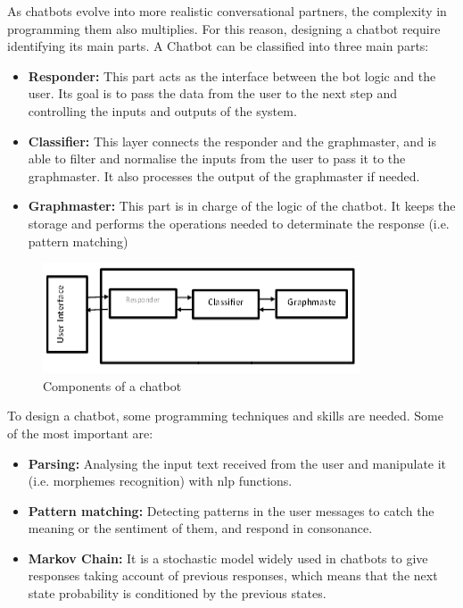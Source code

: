 As chatbots evolve into more realistic conversational partners, the complexity in programming them also multiplies. For this reason, designing a chatbot require identifying its main parts. A Chatbot can be classified into three main parts\cite{design_techniques}:
\begin{itemize}
    \item \textbf{Responder:} This part acts as the interface between the bot logic and the user. Its goal is to pass the data from the user to the next step and controlling the inputs and outputs of the system.
    \item \textbf{Classifier:} This layer connects the responder and the graphmaster, and is able to filter and normalise the inputs from the user to pass it to the graphmaster. It also processes the output of the graphmaster if needed.
    \item \textbf{Graphmaster:} This part is in charge of the logic of the chatbot. It keeps the storage and performs the operations needed to determinate the response (i.e. pattern matching)
\end{itemize}
\begin{figure}[ht]
\includegraphics[scale=1]{docs/img/project_pics/chatbot_parts.png}
\centering
\caption{Components of a chatbot \cite{design_techniques}}
\end{figure}

To design a chatbot, some programming techniques and skills are needed. Some of the most important are:
\begin{itemize}
    \item \textbf{Parsing:} Analysing the input text received from the user and manipulate it (i.e. morphemes recognition) with \acs{nlp} functions. 
    \item \textbf{Pattern matching:} Detecting patterns in the user messages to catch the meaning or the sentiment of them, and respond in consonance. 
    \item \textbf{Markov Chain:} It is a stochastic model widely used in chatbots to give responses taking account of previous responses, which means that the next state probability is conditioned by the previous states.
\end{itemize}
